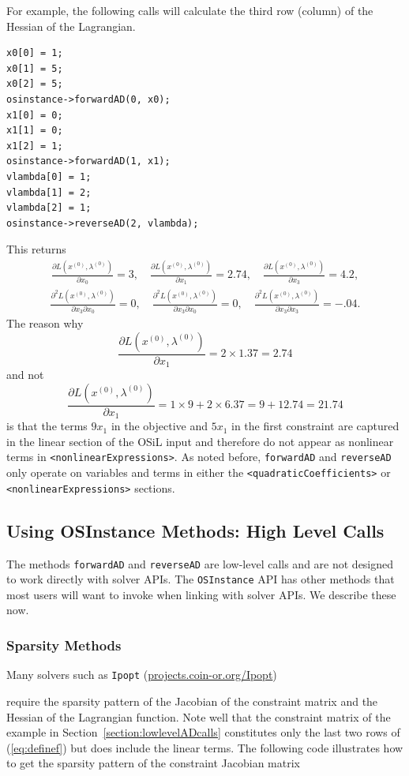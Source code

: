 \documentclass[11pt]{article}
\newcommand{\D}[2]{ \frac{\partial #1}{\partial #2} }
\newcommand{\DD}[3]{ \frac{\partial^2 #1}{\partial #2 \partial #3} }
\renewcommand{\_}{{\char"5F}}
\renewcommand{\{}{{\char"7B}}
\renewcommand{\}}{{\char"7D}}
\renewcommand{\^}{{\char"0D}}
\renewcommand{\'}{{\char"0D}}
\newif\ifknitro \knitrofalse    %
\begin{document}
\begin{enumerate}[Step 1:]
For example, the  following calls will calculate the third row (column) of the Hessian of the Lagrangian.
\begin{verbatim}
x0[0] = 1;
x0[1] = 5;
x0[2] = 5;
osinstance->forwardAD(0, x0);
x1[0] = 0;
x1[1] = 0;
x1[2] = 1;
osinstance->forwardAD(1, x1);
vlambda[0] = 1;
vlambda[1] = 2;
vlambda[2] = 1;
osinstance->reverseAD(2, vlambda);
\end{verbatim}
This returns
\begin{eqnarray*}
\D{L (x^{(0)}, \lambda^{(0)})}{x_{0}} = 3, \quad  
\D{L (x^{(0)}, \lambda^{(0)})}{x_{1}} = 2.74, \quad  
\D{L (x^{(0)}, \lambda^{(0)})}{x_{3}} = 4.2,
\end{eqnarray*}
\begin{eqnarray*}
\DD{L(x^{(0)}, \lambda^{(0)})}{x_{3}}{x_{0}} =0, \quad  
\DD{L(x^{(0)}, \lambda^{(0)})}{x_{3}}{x_{0}} = 0, \quad   
\DD{L(x^{(0)}, \lambda^{(0)})}{x_{3}}{x_{3}} =  -.04.
\end{eqnarray*}
The reason why
$$
\D{L (x^{(0)}, \lambda^{(0)})}{x_{1}} = 2 \times 1.37 = 2.74
$$
and not
$$
\D{L (x^{(0)}, \lambda^{(0)})}{x_{1}} = 1 \times  9 + 2 \times 6.37 = 9 + 12.74 = 21.74
$$
is that the terms $9x_1$ in the objective and $5x_1$ in the first constraint
are captured in the linear section of the OSiL input and therefore do not appear as nonlinear terms
in {\tt  <nonlinearExpressions>}. As noted before, {\tt forwardAD} and {\tt reverseAD} only operate on variables and terms
in either the {\tt <quadraticCoefficients>} or {\tt <nonlinearExpressions>} sections.

\subsection{Using OSInstance Methods: High Level Calls}

The methods {\tt forwardAD} and {\tt reverseAD} are low-level calls and are not designed to work directly with solver APIs. The {\tt OSInstance} API has other methods that most users will want to invoke when linking with solver APIs.  We describe these now.


\subsubsection{Sparsity Methods}

Many solvers such as {\tt Ipopt} (\url{projects.coin-or.org/Ipopt}) 
\ifknitro or Knitro\index{Knitro} (\url{www.ziena.com}) \fi
require the sparsity pattern of the Jacobian of the constraint matrix and the Hessian of the Lagrangian function.
Note well that the constraint matrix of the example in Section~\ref{section:lowlevelADcalls}
constitutes only the last two rows of (\ref{eq:definef}) but does include the linear terms.
The following code illustrates how to get the sparsity pattern of the constraint Jacobian matrix


\end{enumerate}
\end{document}
